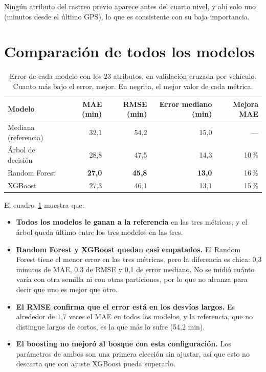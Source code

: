 \documentclass[11pt,a4paper]{article}
\begin{document}
Ningún atributo del rastreo previo aparece antes del cuarto nivel, y ahí solo uno (minutos desde el último
GPS), lo que es consistente con su baja importancia.

\section{Comparación de todos los modelos}

\begin{table}[H]
  \centering
  \begin{tabular}{@{}lrrrr@{}}
    \toprule
    \textbf{Modelo} & \textbf{MAE (min)} & \textbf{RMSE (min)} & \textbf{Error mediano (min)} & \textbf{Mejora MAE} \\
    \midrule
    Mediana (referencia) & 32,1 & 54,2 & 15,0 & --- \\
    Árbol de decisión & 28,8 & 47,5 & 14,3 & 10\,\% \\
    Random Forest & \textbf{27,0} & \textbf{45,8} & \textbf{13,0} & 16\,\% \\
    XGBoost & 27,3 & 46,1 & 13,1 & 15\,\% \\
    \bottomrule
  \end{tabular}
  \caption{Error de cada modelo con los 23 atributos, en validación cruzada por vehículo. Cuanto más bajo
  el error, mejor. En negrita, el mejor valor de cada métrica.}
  \label{tab:final}
\end{table}

El cuadro~\ref{tab:final} muestra que:

\begin{itemize}[nosep]
  \item \textbf{Todos los modelos le ganan a la referencia} en las tres métricas, y el árbol queda último
  entre los tres modelos en las tres.
  \item \textbf{Random Forest y XGBoost quedan casi empatados.} El Random Forest tiene el menor error en
  las tres métricas, pero la diferencia es chica: 0,3 minutos de MAE, 0,3 de RMSE y 0,1 de error mediano.
  No se midió cuánto varía con otra semilla ni con otras particiones, por lo que no alcanza para decir que
  uno es mejor que otro.
  \item \textbf{El RMSE confirma que el error está en los desvíos largos.} Es alrededor de 1,7 veces el MAE
  en todos los modelos, y la referencia, que no distingue largos de cortos, es la que más lo sufre (54,2 min).
  \item \textbf{El boosting no mejoró al bosque con esta configuración.} Los parámetros de ambos son una
  primera elección sin ajustar, así que esto no descarta que con ajuste XGBoost pueda superarlo.
\end{itemize}
\end{document}
